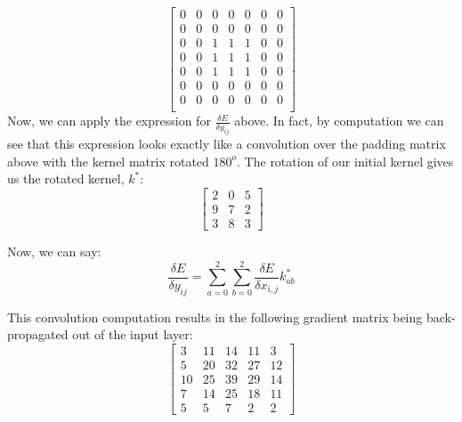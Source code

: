 \documentclass[a4paper]{article}
\begin{document}
\begin{enumerate}
{$$ \begin{bmatrix} 
0 & 0 & 0 & 0 & 0 & 0 & 0 \\
0 & 0 & 0 & 0 & 0 & 0 & 0 \\
0 & 0 & 1 & 1 & 1 & 0 & 0 \\
0 & 0 & 1 & 1 & 1 & 0 & 0 \\
0 & 0 & 1 & 1 & 1 & 0 & 0 \\
0 & 0 & 0 & 0 & 0 & 0 & 0 \\
0 & 0 & 0 & 0 & 0 & 0 & 0 \\
\end{bmatrix} $$
\newline
\newline
Now, we can apply the expression for $ \frac{\delta E}{\delta y_{ij}} $ above. In fact, by computation we can see that this expression looks exactly like a convolution over the padding matrix above with the kernel matrix rotated $180^{o}$. The rotation of our initial kernel gives us the rotated kernel, $k^{*}$:
$$
\begin{bmatrix}
2 & 0 & 5 \\
9 & 7 & 2 \\
3 & 8 & 3 
\end{bmatrix}
$$

Now, we can say:
$$ \frac{\delta E}{\delta y_{ij}} = \sum_{a=0}^2 \sum_{b=0}^2 \frac{\delta E}{\delta x_{i,j}} k^*_{ab}$$

This convolution computation results in the following gradient matrix being back-propagated out of the input layer:
$$
\begin{bmatrix}
3 & 11 & 14 & 11 & 3 \\
5 & 20 & 32 & 27 & 12 \\
10 & 25 & 39 & 29 & 14 \\
7 & 14 & 25 & 18 & 11 \\
5 & 5 & 7 & 2 & 2 
\end{bmatrix}
$$
}
\end{enumerate}
\end{document}
